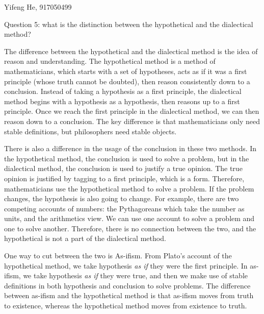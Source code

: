 \documentclass[11pt]{article}
\begin{document}
\begin{center}
    Yifeng He, 917050499
\end{center}

\begin{center}
    Question 5:
    what is the distinction between the hypothetical and the dialectical method?
\end{center}

The difference between the hypothetical and the dialectical method is the
idea of reason and understanding. The hypothetical method is a method of
mathematicians, which starts with a set of hypotheses, acts as if it was
a first principle (whose truth cannot be doubted), then reason
consistently down to a conclusion. Instead of taking a hypothesis as a first
principle, the dialectical method begins with a hypothesis as a
hypothesis, then reasons up to a first principle. Once we reach the first
principle in the dialectical method, we can then reason down to a
conclusion. The key difference is that mathematicians only need stable
definitions, but philosophers need stable objects.

There is also a difference in the usage of the conclusion in these two
methods. In the hypothetical method, the conclusion is used to solve a
problem, but in the dialectical method, the conclusion is used to
justify a true opinion. The true opinion is justified by tagging to a
first principle, which is a form. Therefore, mathematicians use the
hypothetical method to solve a problem. If the problem changes, the
hypothesis is also going to change. For example, there are two competing
accounts of numbers: the Pythagoreans which take the number as units, and the
arithmetics view. We can use one account to solve a problem and one to
solve another. Therefore, there is no connection between the two, and
the hypothetical is not a part of the dialectical method.

One way to cut between the two is As-ifism. From Plato's account of
the hypothetical method, we take hypothesis \textit{as if} they were the first
principle. In as-ifism, we take hypothesis \textit{as if} they were true, and then
we make use of stable definitions in both hypothesis and conclusion to
solve problems. The difference between as-ifism and the hypothetical
method is that as-ifism moves from truth to existence, whereas the
hypothetical method moves from existence to truth.
\end{document}
